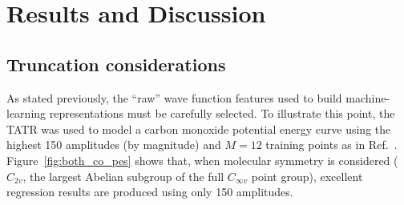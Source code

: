
\section{Results and Discussion} \label{results}
\subsection{Truncation considerations} \label{cutoffs}
As stated previously, the ``raw'' wave function features used to build machine-learning representations must be carefully selected. To illustrate this point, the TATR was used to model a carbon monoxide potential energy curve using the highest 150 amplitudes (by magnitude) and $M = 12$ training points as in Ref.~. 
Figure~\ref{fig:both_co_pes} shows that, when molecular symmetry is considered ($C_{2v}$, the largest Abelian subgroup of the full $C_{\infty v}$ point group), excellent regression results are produced using only 150 amplitudes. 

